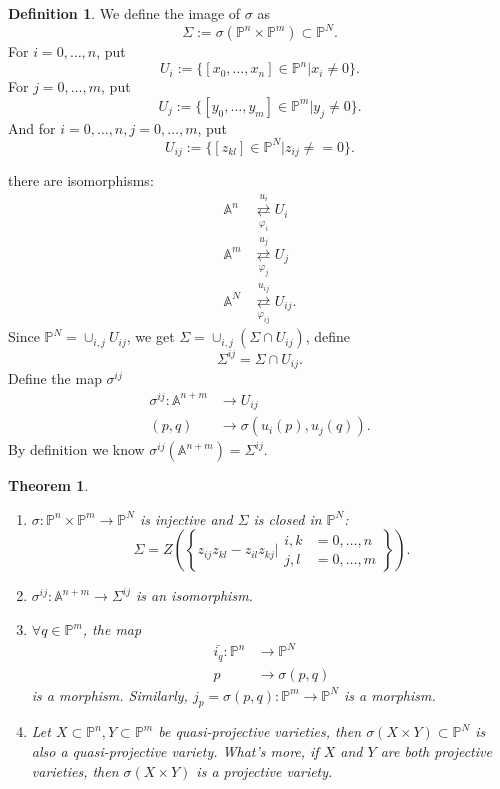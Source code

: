 \documentclass{amsart}
\theoremstyle{plain}
\newtheorem{theorem}{Theorem}
\theoremstyle{definition}
\newtheorem{definition}{Definition}
\theoremstyle{remark}
\numberwithin{equation}{section}
\begin{document}
\begin{definition}
	We define the image of $ \sigma $ as
	$$
	\Sigma := \sigma(\mathbb{P}^n\times \mathbb{P}^m)\subset \mathbb{P}^N.
	$$
	For $ i=0,\dots,n $, put
	$$
	 U_i:=\{ [x_0,\dots,x_n]\in \mathbb{P}^n|x_i\neq 0 \}.
	$$
	 For $ j=0,\dots,m $, put
	 $$
	 U_j:=\{ [y_0,\dots,y_m]\in\mathbb{P}^m|y_j\neq 0 \}.
	 $$
	 And for $ i=0,\dots,n,j=0,\dots,m $, put
	 $$
	 U_{ij}:=\{ [z_{kl}]\in \mathbb{P}^{N}|z_{ij}\neq =0 \}.
	 $$
\end{definition}
there are isomorphisms:
	 $$\begin{array}{cc}
	 \mathbb{A}^n & \mathop{\rightleftarrows}\limits_{\varphi_i}^{u_i}  U_i\\
	 \mathbb{A}^m & \mathop{\rightleftarrows}\limits_{\varphi_j}^{u_j} U_j\\
	 \mathbb{A}^N & \mathop{\rightleftarrows}\limits_{\varphi_{ij}}^{u_{ij}} U_{ij}.
	 \end{array}$$
Since $ \mathbb{P}^N=\mathop{\cup}_{i,j}U_{ij} $, we get $ \Sigma = \mathop{\cup}_{i,j}(\Sigma \cap U_{ij}) $, define
$$
\Sigma^{ij}=\Sigma \cap U_{ij}.
$$
Define the map $ \sigma^{ij} $
$$\begin{array}{cc}
	\sigma^{ij}:\mathbb{A}^{n+m} & \to U_{ij}\\
	(p,q) & \to \sigma (u_i(p),u_j(q)).
\end{array}$$
By definition we know $ \sigma^{ij}(\mathbb{A}^{n+m})=\Sigma^{ij} $.
\begin{theorem}
	\begin{enumerate}
		\item $ \sigma:\mathbb{P}^n\times\mathbb{P}^m\to \mathbb{P}^N $ is injective and $ \Sigma $ is closed in $ \mathbb{P}^N $:
		\begin{equation}\label{17}
		\Sigma=Z\left(\left\lbrace z_{ij}z_{kl}-z_{il}z_{kj}|\begin{matrix}
		i,k & =0,\dots,n\\
		j,l & =0,\dots,m
		\end{matrix} \right\rbrace\right).
		\end{equation}
		\item $ \sigma^{ij}:\mathbb{A}^{n+m}\to \Sigma^{ij} $ is an isomorphism.
		\item $ \forall q\in\mathbb{P}^m $, the map
		$$\begin{array}{cc}
			\bar{i_q}:  \mathbb{P}^n & \to \mathbb{P}^N\\
			p & \to \sigma(p,q)
		\end{array}$$
		is a morphism. Similarly, $ j_p=\sigma(p,q):\mathbb{P}^m\to \mathbb{P}^N $ is a morphism.
		\item Let $ X\subset \mathbb{P}^n,Y\subset \mathbb{P}^m $ be quasi-projective varieties, then $ \sigma(X\times Y)\subset \mathbb{P}^N $ is also a quasi-projective variety. What's more, if $ X $ and $ Y $ are both projective varieties, then $ \sigma(X\times Y) $ is a projective variety.
	\end{enumerate}
\end{theorem}
\end{document}
